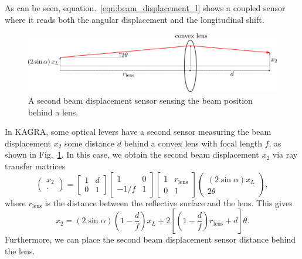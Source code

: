 As can be seen, equation.~\eqref{eqn:beam_displacement_l} shows a coupled sensor where it reads both the angular displacement and the longitudinal shift.

\begin{figure}[!h]
	\centering
	\includegraphics[width=134mm]{figures/optical_lever_lens}
	\caption{A second beam displacement sensor sensing the beam position behind a lens.}
	\label{fig:opticalleverlens}
\end{figure}
In KAGRA, some optical levers have a second sensor measuring the beam displacement $x_2$ some distance $d$ behind a convex lens with focal length $f$, as shown in Fig.~\ref{fig:opticalleverlens}.
In this case, we obtain the second beam displacement $x_2$ via ray transfer matrices \cite{enwiki:1018856234}
\begin{equation}
	\begin{pmatrix}
		x_2\\
		\cdot
	\end{pmatrix}
	=
	\begin{bmatrix}
		1 & d\\
		0 & 1
	\end{bmatrix}
	\begin{bmatrix}
		1 & 0\\
		-1/f & 1
	\end{bmatrix}
	\begin{bmatrix}
		1 & r_\mathrm{lens} \\
		0 & 1
	\end{bmatrix}
	\begin{pmatrix}
		\left(2\sin{\alpha} \right)x_L\\
		2\theta
	\end{pmatrix},
\end{equation}
where $r_\mathrm{lens}$ is the distance between the reflective surface and the lens.
This gives
\begin{equation}
	x_2 = \left(2\sin\alpha\right)\left(1-\frac{d}{f}\right)x_L + 2\left[\left(1-\frac{d}{f}\right)r_\mathrm{lens}+d\right]\theta. 
	\label{eqn:beam_displacement_lens_1}
\end{equation}
Furthermore, we can place the second beam displacement sensor distance behind the lens.
